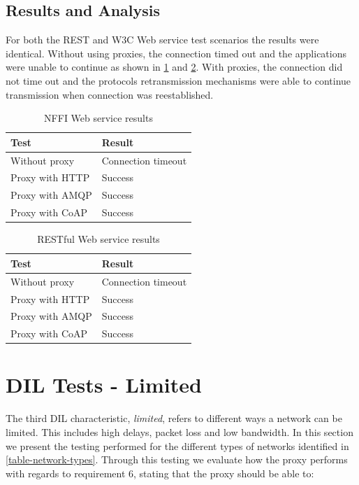 \subsection{Results and Analysis}

For both the REST and W3C Web service test scenarios the results were identical.
Without using proxies, the connection timed out and the applications were unable
to continue as shown in \cref{table:disconnected-nffi} and
\cref{table:disconnected-rest}. With proxies, the connection did not time out
and the protocols retransmission mechanisms were able to continue transmission
when connection was reestablished.


\begin{table}[h!]
\begin{tabular}{| l | l |}
\hline
  \textbf{Test} & \textbf{Result} \\ \hline
  Without proxy & Connection timeout \\ \hline
  Proxy with HTTP & Success \\ \hline
  Proxy with AMQP & Success \\ \hline
  Proxy with CoAP & Success \\ \hline
\end{tabular}
\caption{NFFI Web service results}
\label{table:disconnected-nffi}
\end{table}

\begin{table}[h!]
\begin{tabular}{| l | l |}
\hline
  \textbf{Test} & \textbf{Result} \\ \hline
  Without proxy & Connection timeout \\ \hline
  Proxy with HTTP & Success \\ \hline
  Proxy with AMQP & Success \\ \hline
  Proxy with CoAP & Success \\ \hline
\end{tabular}
\caption{RESTful Web service results}
\label{table:disconnected-rest}
\end{table}


\section{DIL Tests - Limited}
\label{section:tests-limited}

The third DIL characteristic, \textit{limited}, refers to different ways a
network can be limited. This includes high delays, packet loss and low
bandwidth. In this section we present the testing performed for the different
types of networks identified in \cref{table-network-types}. Through this testing
we evaluate how the proxy performs with regards to requirement 6, stating that
the proxy should be able to:


